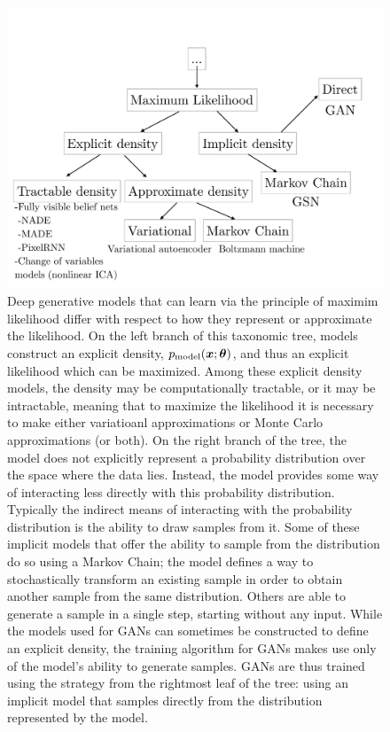 \begin{figure}
\centering
\includegraphics[width=\textwidth]{tree}
\caption{
Deep generative models that can learn via the principle of maximim likelihood
differ with respect to how they represent or approximate the likelihood.
On the left branch of this taxonomic tree, models construct an explicit density,
$p_{\rm{model}}({\bm{x}}; {\bm{\theta}})$, and thus an explicit likelihood which can be maximized.
Among these explicit density models, the density may be computationally tractable,
or it may be intractable, meaning that to maximize the likelihood it is necessary
to make either variatioanl approximations or Monte
Carlo approximations (or both).
On the right branch of the tree, the model does not explicitly represent a
probability distribution over the space where the data lies.
Instead, the model provides some way of interacting less directly with this
probability distribution.
Typically the indirect means of interacting with the probability distribution is
the ability to draw samples from it.
Some of these implicit models that offer the ability to sample from the distribution
do so using a Markov Chain; the model defines a way to stochastically transform
an existing sample in order to obtain another sample from the same distribution.
Others are able to generate a sample in a single step, starting without any input.
While the models used for GANs can sometimes be constructed to define an explicit
density, the training algorithm for GANs makes use only of the model's ability to
generate samples.
GANs are thus trained using the strategy from the rightmost leaf of the tree:
using an implicit model that samples directly from the distribution represented
by the model.
}
\label{fig:tree}
\end{figure}

